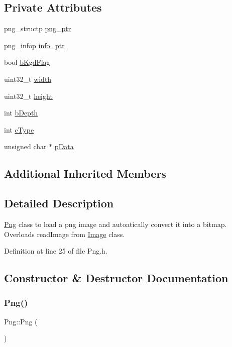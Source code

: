\subsection*{Private Attributes}
\begin{DoxyCompactItemize}
\item 
png\+\_\+structp \mbox{\hyperlink{classPng_acbf8ea4c3185452d8620432e5fbd3e38}{png\+\_\+ptr}}
\item 
png\+\_\+infop \mbox{\hyperlink{classPng_a33d2aad2ce8332b520bab0842ba7d5d9}{info\+\_\+ptr}}
\item 
bool \mbox{\hyperlink{classPng_ae40f44717df30fac8de85a5c9fa429d6}{b\+Kgd\+Flag}}
\item 
uint32\+\_\+t \mbox{\hyperlink{classPng_a30b6c073e17f2f0cde3eca9e31036f3c}{width}}
\item 
uint32\+\_\+t \mbox{\hyperlink{classPng_a46412756311804d40e8e8bf62633e40f}{height}}
\item 
int \mbox{\hyperlink{classPng_a96907d5307f3d79f20c5daaea24c84fa}{b\+Depth}}
\item 
int \mbox{\hyperlink{classPng_ae8acde4e85d5da0271325abfabb8a24c}{c\+Type}}
\item 
unsigned char $\ast$ \mbox{\hyperlink{classPng_a7d98b75596a172d31599b3e1102210ab}{p\+Data}}
\end{DoxyCompactItemize}
\subsection*{Additional Inherited Members}


\subsection{Detailed Description}
\mbox{\hyperlink{classPng}{Png}} class to load a png image and autoatically convert it into a bitmap. Overloads read\+Image from \mbox{\hyperlink{classImage}{Image}} class. 

Definition at line 25 of file Png.\+h.



\subsection{Constructor \& Destructor Documentation}
\mbox{\label{classPng_a1b526fc595b9f38850e1b93e5bb40301}} 
\subsubsection{\texorpdfstring{Png()}{Png()}\hspace{0.1cm}{\footnotesize\ttfamily [1/3]}}
{\footnotesize\ttfamily Png\+::\+Png (\begin{DoxyParamCaption}{ }\end{DoxyParamCaption})}



